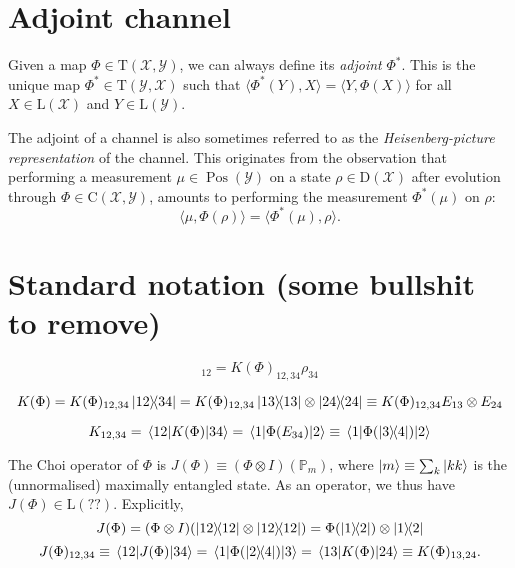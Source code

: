 \documentclass[a4paper]{report}
\newcommand{\PP}{\mathbb{P}}
\newcommand{\on}[1]{\operatorname{#1}}
\newcommand{\calY}{{\mathcal{Y}}}
\newcommand{\calX}{{\mathcal{X}}}
\newcommand{\rmC}{{\mathrm{C}}}
\newcommand{\rmD}{{\mathrm{D}}}
\newcommand{\rmL}{{\mathrm{L}}}
\newcommand{\rmT}{{\mathrm{T}}}
\DeclareMathOperator{\Pos}{Pos}
\begin{document}
\section{Adjoint channel}

Given a map $\Phi\in\rmT(\calX,\calY)$, we can always define its \emph{adjoint} $\Phi^*$. This is the unique map $\Phi^*\in\rmT(\calY,\calX)$ such that $\langle \Phi^*(Y),X\rangle=\langle Y,\Phi(X)\rangle$ for all $X\in\rmL(\calX)$ and $Y\in\rmL(\calY)$.

The adjoint of a channel is also sometimes referred to as the \emph{Heisenberg-picture representation} of the channel. This originates from the observation that performing a measurement $\mu\in\Pos(\calY)$ on a state $\rho\in\rmD(\calX)$ after evolution through $\Phi\in\rmC(\calX,\calY)$, amounts to performing the measurement $\Phi^*(\mu)$ on $\rho$:
\begin{equation}
	\langle \mu,\Phi(\rho) \rangle = \langle \Phi^*(\mu),\rho\rangle.
\end{equation}

\section{Standard notation (some bullshit to remove)}

\begin{equation}
	[K(\Phi)\on{vec}(\rho)]_{12} = K(\Phi)_{12,34}\rho_{34}
\end{equation}

\begin{equation}
	K(\Phi)
	= K(\Phi)_{12,34} \ketbra{12}{34}
	= K(\Phi)_{12,34} \ketbra{13}\otimes\ketbra{24}
	\equiv K(\Phi)_{12,34} E_{13}\otimes E_{24}
\end{equation}

\begin{equation}
	K_{12,34} = \mel{12}{K(\Phi)}{34}
	= \mel{1}{\Phi(E_{34})}{2}
	\equiv \mel{1}{\Phi(\ketbra{3}{4})}{2}
\end{equation}

The Choi operator of $\Phi$ is $J(\Phi)\equiv (\Phi\otimes I)(\PP_m)$, where $\ket m\equiv\sum_k \ket{kk}$ is the (unnormalised) maximally entangled state.
As an operator, we thus have $J(\Phi)\in\rmL(??)$.
Explicitly,
\begin{equation}
	J(\Phi) = (\Phi\otimes I)(\ketbra{12}\otimes\ketbra{12})
	= \Phi(\ketbra{1}{2})\otimes \ketbra{1}{2}
\end{equation}
\begin{equation}
	J(\Phi)_{12,34}
	\equiv \mel{12}{J(\Phi)}{34}
	= \mel{1}{\Phi(\ketbra{2}{4})}{3}
	= \mel{13}{K(\Phi)}{24}
	\equiv K(\Phi)_{13,24}.
\end{equation}
\end{document}
